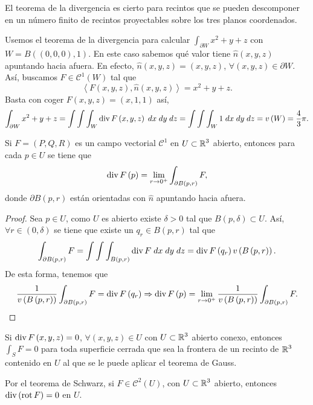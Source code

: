 \begin{observation}
El teorema de la divergencia es cierto para recintos que se pueden descomponer en un número finito de recintos proyectables sobre los tres planos coordenados.
\end{observation}
\begin{eg}
Usemos el teorema de la divergencia para calcular $\displaystyle \int _{\partial W}x^{2}+y+z $ con $\displaystyle W = B\left(\left(0,0,0\right), 1\right) $. En este caso sabemos qué valor tiene $\displaystyle \hat{n}\left(x,y,z\right) $ apuntando hacia afuera. En efecto, $\displaystyle \hat{n}\left(x,y,z\right)=\left(x,y,z\right) $, $\displaystyle \forall \left(x,y,z\right)\in \partial W $. Así, buscamos $\displaystyle F\in \mathcal{C}^{1}\left(W\right) $ tal que 
\[\left\langle F\left(x,y,z\right), \hat{n}\left(x,y,z\right) \right\rangle =x^{2}+y+z .\]
Basta con coger $\displaystyle F\left(x,y,z\right)=\left(x,1,1\right) $ así,
\[\int _{\partial W}x^{2}+y+z = \int \int \int _{W}\operatorname{div} F\left(x,y,z\right) \; dx \; dy \; dz = \int \int \int _{W}1 \; dx \; dy \; dz = v\left(W\right)=\frac{4}{3}\pi  .\]
\end{eg}
\begin{colorary}
Si $\displaystyle F = \left(P, Q, R\right) $ es un campo vectorial $\displaystyle \mathcal{C}^{1} $ en $\displaystyle U\subset \mathbb{R}^{3} $ abierto, entonces para cada $\displaystyle p \in U $ se tiene que 
\[\operatorname{div} F\left(p\right)= \lim_{r \to 0^{+}}\int _{\partial B\left(p,r\right)}F  ,\]
donde $\displaystyle \partial B\left(p,r\right) $ están orientadas con $\displaystyle \hat{n} $ apuntando hacia afuera.
\end{colorary}
\begin{proof}
Sea $\displaystyle p \in U $, como $\displaystyle U $ es abierto existe $\displaystyle \delta > 0 $ tal que $\displaystyle B\left(p, \delta \right)\subset U $. Así, $\displaystyle \forall r \in \left(0, \delta \right) $ se tiene que existe un $\displaystyle q_{r}\in B\left(p, r\right) $ tal que
\[\int _{\partial B\left(p, r\right)}F = \int \int \int _{B\left(p, r\right)}\operatorname{div} F \; dx \; dy \; dz = \operatorname{div} F\left(q_{r}\right)v\left(B\left(p, r\right)\right) .\]
De esta forma, tenemos que 
\[\frac{1}{v\left(B\left(p,r\right)\right)}\int _{\partial B\left(p,r\right)}F =\operatorname{div} F\left(q_{r}\right) \Rightarrow \operatorname{div} F\left(p\right) = \lim_{r \to 0^{+}}\frac{1}{v\left(B\left(p,r\right)\right)}\int _{\partial B\left(p,r\right)}F.\]
\end{proof}
\begin{prop}
Si $\displaystyle \operatorname{div} F\left(x,y,z\right)=0 $, $\displaystyle \forall \left(x,y,z\right)\in U $ con $\displaystyle U \subset \mathbb{R}^{3} $ abierto conexo, entonces $\displaystyle \int _{S}F =0 $ para toda superficie cerrada que sea la frontera de un recinto de $\displaystyle \mathbb{R}^{3} $ contenido en $\displaystyle U $ al que se le puede aplicar el teorema de Gauss.
\end{prop}
\begin{prop}
Por el teorema de Schwarz, si $\displaystyle F \in \mathcal{C}^{2}\left(U\right) $, con $\displaystyle U \subset \mathbb{R}^{3} $ abierto, entonces $\displaystyle \operatorname{div}\left(\operatorname{rot} F\right)= 0 $ en $\displaystyle U $. 
\end{prop}

